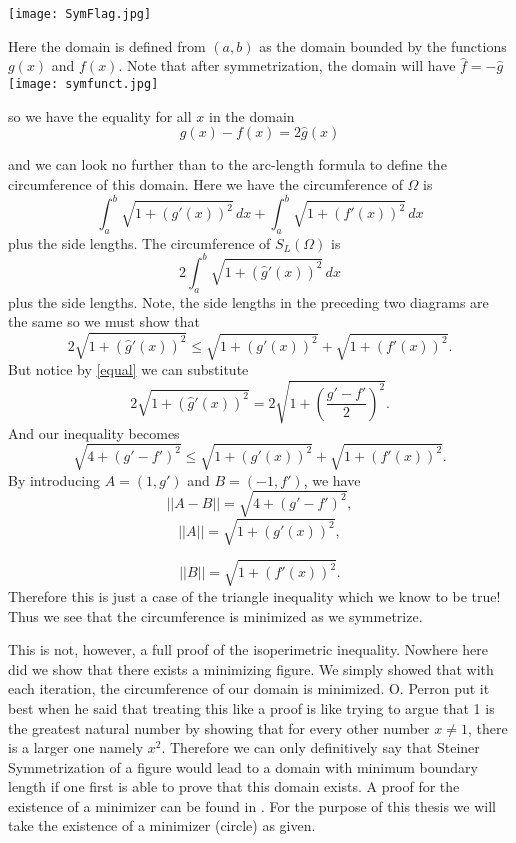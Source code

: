\documentclass[12pt]{report}
\numberwithin{definition}{section}
\begin{document}
 		\texttt{[image: SymFlag.jpg]}
 		
 	Here the domain is defined from $(a, b)$ as the domain bounded by the functions $g(x)$ and $f(x)$. Note that after symmetrization, the domain will have $\hat{f} = -\hat{g}$
 		\texttt{[image: symfunct.jpg]}
 	
 	so we have the equality for all $x$ in the domain 
 	\begin{equation}\label{equal}
 	g(x)-f(x)=2\hat{g}(x)
 	\end{equation}
 	
 	and we can look no further than to the arc-length formula to define the circumference of this domain. Here we have the circumference of $\Omega$ is 
 	\[
 	\int^b_a \sqrt{1+(g'(x))^2}  \,dx+\int^b_a \sqrt{1+(f'(x))^2}  \,dx
 	\]
 	plus the side lengths. The circumference of $S_L(\Omega)$ is 
 	\[
 	2\int^b_a \sqrt{1+(\hat{g}'(x))^2}  \,dx
 	\]
 	plus the side lengths. Note, the side lengths in the preceding two diagrams are the same so we must show that 
 	\[
 		2 \sqrt{1+(\hat{g}'(x))^2} \leq 	 \sqrt{1+(g'(x))^2}+ \sqrt{1+(f'(x))^2}.
 	\]
 	But notice by \eqref{equal} we can substitute
 	\[
 	2 \sqrt{1+(\hat{g}'(x))^2} = 2\sqrt{1+(\frac{g'-f'}{2})^2} . 
 	\]
 	And our inequality becomes 
 	\[
 	\sqrt{4+(g'-f')^2} \leq \sqrt{1+(g'(x))^2}+ \sqrt{1+(f'(x))^2} . 
 	\]
 	 By introducing $A = (1, g')$ and $B = (-1, f')$, we have 
 	\[
 	||A-B|| = 	\sqrt{4+(g'-f')^2},
 	\]
    \[
    ||A|| = \sqrt{1+(g'(x))^2},
    \]
    
    \[
    ||B|| = \sqrt{1+(f'(x))^2}.
    \]
    Therefore this is just a case of the triangle inequality which we know to be true! Thus we see that the circumference is minimized as we symmetrize. 
    
 	This is not, however, a full proof of the isoperimetric inequality. Nowhere here did we show that there exists a minimizing figure. We simply showed that with each iteration, the circumference of our domain is minimized. O. Perron put it best when he said that treating this like a proof is like trying to argue that 1 is the greatest natural number by showing that for every other number $x\neq 1$, there is a larger one namely $x^2$. Therefore we can only definitively say that Steiner Symmetrization  of a figure would lead to a domain with minimum boundary length if one first is able to prove that this domain exists. A proof for the existence of a minimizer can be found in \cite{Blas}. For the purpose of this thesis we will take the existence of a minimizer (circle) as given.
 	
\end{document}
